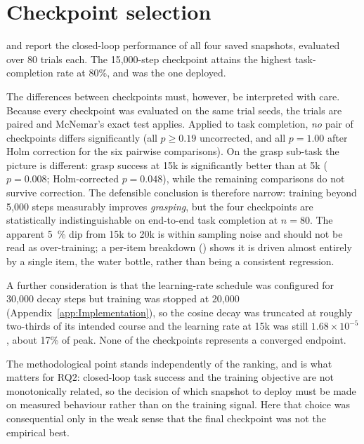 \section{Checkpoint selection}
\label{sec:results-checkpoint}
 and  report the closed-loop
performance of all four saved snapshots, evaluated over 80 trials each. The
15{,}000-step checkpoint attains the highest task-completion rate at 80\%, and was
the one deployed.

The differences between checkpoints must, however, be interpreted with care. Because
every checkpoint was evaluated on the same trial seeds, the trials are paired and
McNemar's exact test applies. Applied to task completion, \emph{no} pair of
checkpoints differs significantly (all $p \ge 0.19$ uncorrected, and all $p = 1.00$
after Holm correction for the six pairwise comparisons). On the grasp sub-task the
picture is different: grasp success at 15k is significantly better than at 5k
($p = 0.008$; Holm-corrected $p = 0.048$), while the remaining comparisons do not
survive correction. The defensible conclusion is therefore narrow: training beyond
5{,}000 steps measurably improves \emph{grasping}, but the four checkpoints are
statistically indistinguishable on end-to-end task completion at $n=80$. The apparent
\SI{5}{\percent} dip from 15k to 20k is within sampling noise and should not be read
as over-training; a per-item breakdown () shows it is driven
almost entirely by a single item, the water bottle, rather than being a consistent
regression.

A further consideration is that the learning-rate schedule was configured for
30{,}000 decay steps but training was stopped at 20{,}000
(Appendix~\ref{app:Implementation}), so the cosine decay was truncated at roughly two-thirds
of its intended course and the learning rate at 15k was still $1.68\times10^{-5}$,
about 17\% of peak. None of the checkpoints represents a converged endpoint.

The methodological point stands independently of the ranking, and is what matters for
RQ2: closed-loop task success and the training objective are not monotonically
related, so the decision of which snapshot to deploy must be made on measured
behaviour rather than on the training signal. Here that choice was consequential only
in the weak sense that the final checkpoint was not the empirical best.

